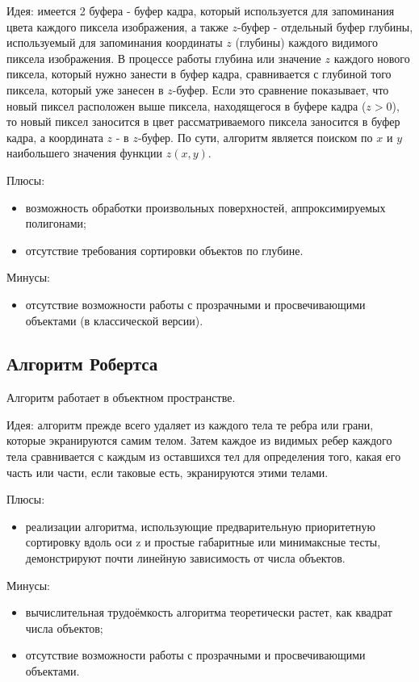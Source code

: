 Идея: имеется 2 буфера - буфер кадра, который используется для запоминания цвета каждого пиксела изображения, а также $z$-буфер - отдельный буфер глубины, используемый для запоминания координаты $z$ (глубины) каждого видимого пиксела изображения. В процессе работы глубина или значение $z$ каждого нового пиксела, который нужно занести в буфер кадра, сравнивается с глубиной того пиксела, который уже занесен в $z$-буфер. Если это сравнение показывает, что новый пиксел расположен выше пиксела, находящегося в буфере кадра ($z > 0$), то новый пиксел заносится в цвет рассматриваемого пиксела заносится в буфер кадра, а координата $z$ - в $z$-буфер. По сути, алгоритм является поиском по $x$ и $y$ наибольшего значения функции $z(x, y)$.

Плюсы:
\begin{itemize}
    \item возможность обработки произвольных поверхностей, аппроксимируемых полигонами;
    \item отсутствие требования сортировки объектов по глубине.
\end{itemize}

Минусы:
\begin{itemize}
    \item отсутствие возможности работы с прозрачными и просвечивающими объектами (в классической версии).
\end{itemize}

\subsection{Алгоритм Робертса}
Алгоритм работает в объектном пространстве\cite{robert}.

Идея: алгоритм прежде всего удаляет из каждого тела те ребра или грани, которые экранируются самим телом. Затем каждое из видимых ребер каждого тела сравнивается с каждым из оставшихся тел для определения того, какая его часть или части, если таковые есть, экранируются этими телами.

Плюсы:
\begin{itemize}
    \item реализации алгоритма, использующие предварительную приоритетную сортировку вдоль оси z и простые габаритные или минимаксные тесты, демонстрируют почти линейную зависимость от числа объектов\cite{robert}.
\end{itemize}

Минусы:
\begin{itemize}
    \item вычислительная трудоёмкость алгоритма теоретически растет, как квадрат числа объектов\cite{robert};
    \item отсутствие возможности работы с прозрачными и просвечивающими объектами.
\end{itemize}

